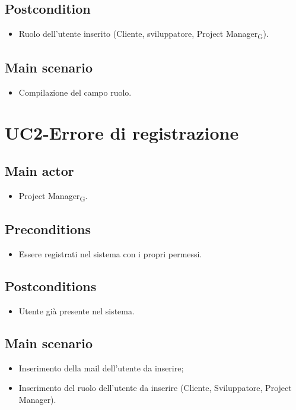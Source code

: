 \documentclass{article}
\begin{document}
        \subsection*{Postcondition} 
        \begin{itemize}
            \item Ruolo dell'utente inserito (Cliente, sviluppatore, Project Manager\textsubscript{G}).
        \end{itemize}
        \subsection*{Main scenario}
        \begin{itemize}
        \item Compilazione del campo ruolo.
        \end{itemize}

\section{UC2-Errore di registrazione}
    \subsection*{Main actor}
         \begin{itemize}
             \item Project Manager\textsubscript{G}.
         \end{itemize}
         
     \subsection*{Preconditions} 
        \begin{itemize}
            \item Essere registrati nel sistema con i propri permessi.
        \end{itemize}
        
    \subsection*{Postconditions}
        \begin{itemize}
            \item Utente già presente nel sistema.
        \end{itemize}
        \subsection*{Main scenario}
        \begin{itemize}
        \item Inserimento della mail dell'utente da inserire;
        \item Inserimento del ruolo dell'utente da inserire (Cliente, Sviluppatore, Project Manager).
        \end{itemize}
\end{document}

